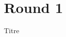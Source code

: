 \documentclass{beamer}
\begin{document}
\section{Round 1}


\begin{frame}{Titre}
\end{frame}
\end{document}
